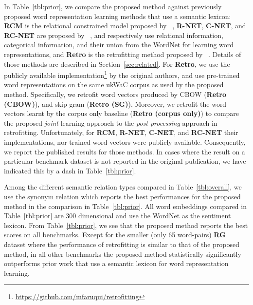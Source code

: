 \documentclass[letterpaper]{article}
\newcommand{\citet}[1]{\citeauthor{#1} \shortcite{#1}}
\begin{document}
In Table~\ref{tbl:prior}, we compare the proposed method against previously proposed 
word representation learning methods that use a semantic lexicon:
\textbf{RCM} is the relational constrained model proposed by~\citet{Yu:ACL:2014}, 
\textbf{R-NET}, \textbf{C-NET}, and \textbf{RC-NET} are proposed by~\citet{Xu:2014},
and respectively use relational information, categorical information, 
and their union from the WordNet for learning word representations,
and \textbf{Retro} is the retrofitting method proposed by~\citet{faruqui-EtAl:2015:NAACL-HLT}.
Details of those methods are described in Section~\ref{sec:related}.
For \textbf{Retro}, we use the publicly available implementation\footnote{\url{https://github.com/mfaruqui/retrofitting}}
 by the original authors, 
and use pre-trained word representations on the same ukWaC corpus as used
by the proposed method. Specifically, we retrofit word vectors produced by CBOW (\textbf{Retro (CBOW)}), and
skip-gram (\textbf{Retro (SG)}). Moreover, we retrofit the word vectors learnt by the corpus only baseline
(\textbf{Retro (corpus only)}) to compare the proposed \emph{joint} learning approach to the \emph{post-processing} approach
in retrofitting. Unfortunately, for \textbf{RCM}, \textbf{R-NET}, \textbf{C-NET}, and \textbf{RC-NET} 
their implementations, nor trained word vectors were publicly available. Consequently, we report the published results for those methods. 
In cases where the result on a particular benchmark dataset is not reported in the original publication, we have indicated this
by a dash in Table~\ref{tbl:prior}.

Among the different semantic relation types compared in Table~\ref{tbl:overall}, we use the synonym relation which reports
the best performances for the proposed method in the comparison in Table~\ref{tbl:prior}.
All word embeddings compared in Table~\ref{tbl:prior} are $300$ dimensional and use the WordNet as the sentiment lexicon.
From Table~\ref{tbl:prior}, we see that the proposed method reports the best scores on all benchmarks.
Except for the smaller (only 65 word-pairs) \textbf{RG} dataset where the performance of  retrofitting is similar to that of the proposed method,
in all other benchmarks the proposed method statistically significantly outperforms prior work that use a semantic lexicon
for word representation learning.
\end{document}
